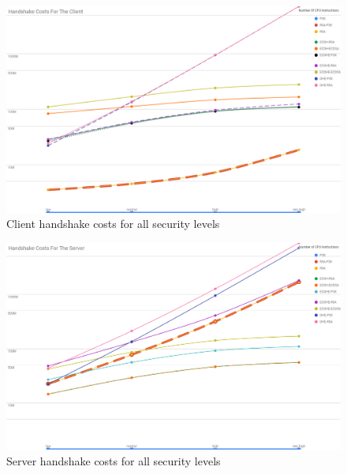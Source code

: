 \documentclass{llncs}
\begin{document}
\begin{figure}
  \centering
  \includegraphics[width=1.0\textwidth]{img/client_hs_costs_all_sls.png}
  \centering \caption{\label{fig:client-sl-costs-all-sls} Client handshake costs for all security levels}
\end{figure}

\begin{figure}
  \centering
  \includegraphics[width=1.0\textwidth]{img/server_hs_costs_all_sls.png}
  \centering \caption{\label{fig:server-sl-costs-all-sls} Server handshake costs for all security levels}
\end{figure}
\end{document}
